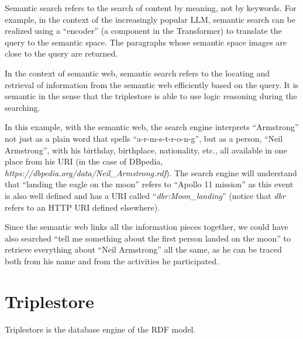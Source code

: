 Semantic search refers to the search of content by meaning, not by keywords. For example, in the context of the increasingly popular LLM, semantic search can be realized using a ``encoder'' (a component in the Transformer) to translate the query to the semantic space. The paragraphs whose semantic space images are close to the query are returned.

In the context of semantic web, semantic search refers to the locating and retrieval of information from the semantic web efficiently based on the query. It is semantic in the sense that the triplestore is able to use logic reasoning during the searching.

In this example, with the semantic web, the search engine interprets ``Armstrong'' not just as a plain word that spells ``a-r-m-s-t-r-o-n-g'', but as a person, ``Neil Armstrong'', with his birthday, birthplace, nationality, etc., all available in one place from his URI (in the case of DBpedia, \textit{https://dbpedia.org/data/Neil\_Armstrong.rdf}). The search engine will understand that ``landing the eagle on the moon'' refers to ``Apollo 11 mission'' as this event is also well defined and has a URI called ``\textit{dbr:Moon\_landing}'' (notice that \textit{dbr} refers to an HTTP URI defined elsewhere). 

Since the semantic web links all the information pieces together, we could have also searched ``tell me something about the first person landed on the moon'' to retrieve everything about ``Neil Armstrong'' all the same, as he can be traced both from his name and from the activities he participated.


















\section{Triplestore}

Triplestore is the database engine of the RDF model. 

